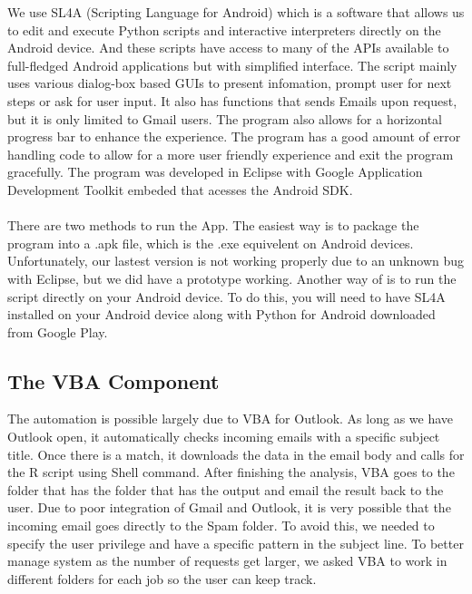 \documentclass[12pt]{article}
\begin{document}
We use SL4A (Scripting Language for Android) which is a software that allows us to edit and execute Python scripts and interactive interpreters directly on the Android device. 
And these scripts have access to many of the APIs available to full-fledged Android applications but with simplified interface. 
The script mainly uses various dialog-box based GUIs to present infomation, prompt user for next steps or ask for user input. 
It also has functions that sends Emails upon request, but it is only limited to Gmail users.
The program also allows for a horizontal progress bar to enhance the experience. 
The program has a good amount of error handling code to allow for a more user friendly experience and exit the program gracefully.
The program was developed in Eclipse with Google Application Development Toolkit embeded that acesses the Android SDK. \\
\\
There are two methods to run the App. The easiest way is to package the program into a .apk file, which is the .exe equivelent on Android devices. 
Unfortunately, our lastest version is not working properly due to an unknown bug with Eclipse, but we did have a prototype working. 
Another way of is to run the script directly on your Android device.
To do this, you will need to have SL4A installed on your Android device along with Python for Android downloaded from Google Play. 


\subsection{The VBA Component}

The automation is possible largely due to VBA for Outlook. 
As long as we have Outlook open, it automatically checks incoming emails with a specific subject title. 
Once there is a match, it downloads the data in the email body and calls for the R script using Shell command.
After finishing the analysis, VBA goes to the folder that has the folder that has the output and email the result back to the user.
Due to poor integration of Gmail and Outlook, it is very possible that the incoming email goes directly to the Spam folder. 
To avoid this, we needed to specify the user privilege and have a specific pattern in the subject line.
To better manage system as the number of requests get larger, we asked VBA to work in different folders for each job so the user can keep track. 
\end{document}
